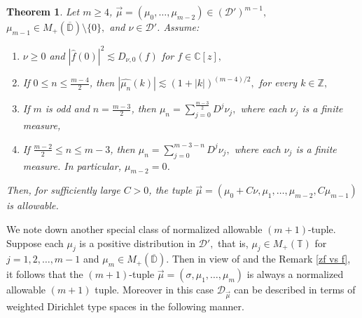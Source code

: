\documentclass[10pt,oneside,reqno]{amsart}
\newtheorem{theorem}{Theorem}[section]
\theoremstyle{definition}
\theoremstyle{remark}
\newcommand{\abs}[1]{\left\lvert #1 \right\rvert}
\renewcommand{\le}{\leqslant}
\renewcommand{\ge}{\geqslant}
\newcommand{\D}{\mathbb D}
\numberwithin{equation}{section}
\begin{document}
\begin{theorem}
Let $m \ge 4$, $\overrightarrow{\mu}= (\mu_0,\dots,\mu_{m-2}) \in (\mathcal D')^{m-1},$ $\mu_{m-1}\in M_+(\overline{\D})\setminus \{0\},$ and 
$\nu \in \mathcal D'$. Assume:

    \begin{enumerate}[label=(\roman*)]
        \item $\nu \ge 0$ and $\abs{\hat f(0)}^2 \lesssim D_{\nu,0}(f)$ for $f\in \mathbb C[z],$ 
        \item If $0 \le n \le \frac{m-4}{2}$, then $\abs{\hat{\mu_n}(k)} \lesssim (1+|k|)^{(m-4)/2},$ for every $k \in \mathbb Z,$       
        \item If $m$ is odd and $n=\frac{m-3}{2}$, then $\mu_n=\sum_{j=0}^{\frac{m-3}{2}} D^j \nu_j,$ where each $\nu_j$ is a finite measure, 
        \item If $\frac{m-2}{2} \le n \le m-3$, then $\mu_n=\sum_{j=0}^{m-3-n} D^j \nu_j,$
        where each $\nu_j$ is a finite measure. In particular, $\mu_{m-2}=0$.
    \end{enumerate}
Then, for sufficiently large $C>0$, the tuple $\overrightarrow{\mu}= (\mu_0+C\nu,\mu_1,\dots,\mu_{m-2},C\mu_{m-1})$ is allowable.
\end{theorem}

    
    

 We note down another special class of normalized allowable $(m+1)$-tuple. Suppose each $\mu_j$ is a positive distribution in $\mathcal D',$ that is, $\mu_j \in M_+(\mathbb T)$ for $j=1,2,\ldots,m-1$ and $\mu_m\in M_+(\overline{\D}).$ Then in view of \cite[Proposition 5.7, Lemma 5.8]{Rydhe19} and the Remark \ref{zf vs f}, it follows that the $(m+1)$-tuple  $\overrightarrow{\mu} = \left( \sigma, \mu_{1}, \ldots ,\mu_{m} \right)$ is always a normalized allowable $(m+1)$ tuple. Moreover in this case $\mathscr D_{\overrightarrow{\mu}}$ can be described in terms of weighted Dirichlet type spaces in the following manner. 
 
\end{document}
